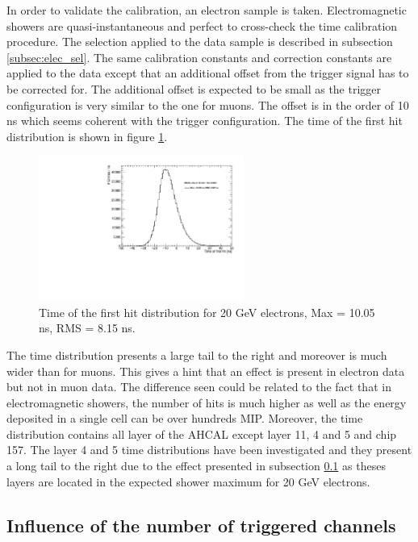 \documentclass[twoside,a4paper,11pt]{article}
\begin{document}
In order to validate the calibration, an electron sample is taken. Electromagnetic showers are quasi-instantaneous and perfect to cross-check the time calibration procedure. The selection applied to the data sample is described in subsection \ref{subsec:elec_sel}. The same calibration constants and correction constants are applied to the data except that an additional offset from the trigger signal has to be corrected for. The additional offset is expected to be small as the trigger configuration is very similar to the one for muons. The offset is in the order of 10 ns which seems coherent with the trigger configuration. The time of the first hit distribution is shown in figure \ref{fig:Timing_electrons}.
\begin{figure}[htbp]
\begin{center}
\includegraphics[width=0.6\textwidth]{fig/Electrons_MuonCalib/Timing_AllLayers.pdf}
\caption{Time of the first hit distribution for 20 GeV electrons, Max = 10.05 ns, RMS = 8.15 ns.}
\label{fig:Timing_electrons}
\end{center}
\end{figure}
The time distribution presents a large tail to the right and moreover is much wider than for muons. This gives a hint that an effect is present in electron data but not in muon data. The difference seen could be related to the fact that in electromagnetic showers, the number of hits is much higher as well as the energy deposited in a single cell can be over hundreds MIP. Moreover, the time distribution contains all layer of the AHCAL except layer 11, 4 and 5 and chip 157. The layer 4 and 5 time distributions have been investigated and they present a long tail to the right due to the effect presented in subsection \ref{subsec:ped_shift} as theses layers are located in the expected shower maximum for 20 GeV electrons.

\subsection{Influence of the number of triggered channels}
\label{subsec:ped_shift}
\end{document}

